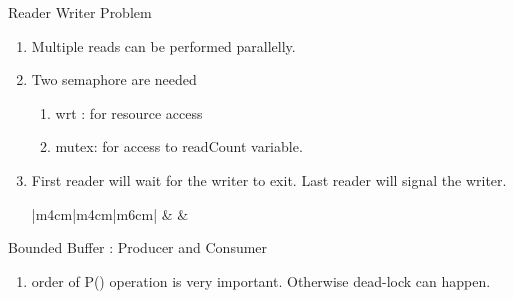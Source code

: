 \begin{enumerate}
  \item Reader Writer Problem
  \begin{enumerate}
    \item Multiple reads can be performed parallelly.
    \item Two semaphore are needed
      \begin{enumerate}
        \item wrt : for resource access
        \item mutex: for access to readCount variable.
      \end{enumerate}
      \item First reader will wait for the writer to exit. Last reader will signal the writer. \\
      \begin{myTableStyle}
        \begin{tabular}{ |m{4cm}|m{4cm}|m{6cm}| } \hline
               &
               &
             \\ \hline
        \end{tabular}
      \end{myTableStyle}
      \vspace{0.08in}
  \end{enumerate}

 \begin{minipage}{\linewidth}
  \item Bounded Buffer : Producer and Consumer
    \begin{enumerate}
      \item order of P() operation is very important. Otherwise dead-lock can happen.
    \end{enumerate}
      \begin{myTableStyle}
        \begin{tabular}{ |m{4.5cm}|m{5cm}| } \hline
               &
              \\ \hline
        \end{tabular}
      \end{myTableStyle}
      \vspace{0.08in}
  \end{minipage}
  \vspace{0.08in}


\end{enumerate}
